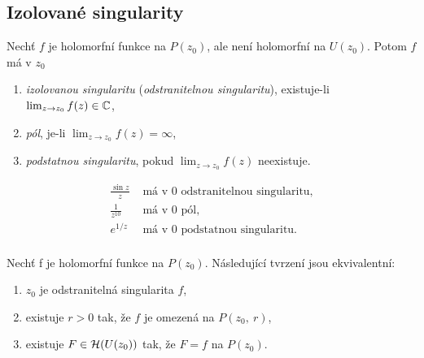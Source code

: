 \subsection{Izolované singularity}
\begin{definition}
Nechť $f$ je holomorfní funkce na $P(z_0)$, ale není holomorfní na $U(z_0)$. Potom $f$ má v $z_0$
\begin{enumerate}
    \item \emph{izolovanou singularitu} (\emph{odstranitelnou singularitu}), existuje-li $\lim_{z\rightarrow z_0}f(z)\in\operatorname{\mathbb{C}}$,
    \item \emph{pól}, je-li $\lim_{z\rightarrow z_0}f(z)=\infty$,
    \item \emph{podstatnou singularitu}, pokud $\lim_{z\rightarrow z_0}f(z)$ neexistuje.
\end{enumerate}
\end{definition}
\begin{example}
\begin{align*}
     \frac{\sin{z}}{z}& \text{ má v 0 odstranitelnou singularitu,}\\
     \frac{1}{z^{10}}& \text{ má v 0 pól,}\\
     e^{1/z}& \text{ má v 0 podstatnou singularitu.}\\
\end{align*}
\end{example}
\begin{theorem} Nechť f je holomorfní funkce na $P(z_0)$. Následující tvrzení jsou ekvivalentní:
\begin{enumerate}
    \item $z_0$ je odstranitelná singularita $f$,
    \item existuje $r>0$ tak, že $f$ je omezená na $P(z_0,\ r)$,
    \item existuje $F\in \operatorname{\mathcal{H}} (U(z_0))$ tak, že $F=f$ na $P(z_0)$.
\end{enumerate}
\end{theorem}

